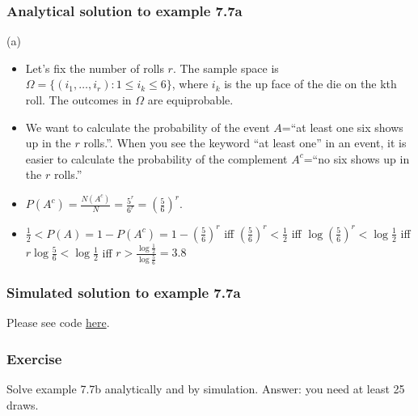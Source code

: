 \begin{frame}
    \frametitle{Analytical solution to example 7.7a}

	(a)
    \begin{itemize}[<+->]

		\item Let's fix the number of rolls $r$. The sample space is
$\Omega=\{(i_1,\ldots,i_r): 1\leq i_k\leq 6\}$, where $i_k$ is the up face of
the die on the kth roll. The outcomes in $\Omega$ are equiprobable.

        \item We want to calculate the probability of the event $A$=``at least
            one six shows up in the $r$ rolls.''. When you see the keyword ``at
            least one'' in an event, it is easier to calculate the probability
            of the complement $A^c$=``no six shows up in the $r$ rolls.''

        \item
            $P(A^c)=\frac{N(A^c)}{N}=\frac{5^r}{6^r}=\left(\frac{5}{6}\right)^r$.

        \item
            $\frac{1}{2}<P(A)=1-P(A^c)=1-\left(\frac{5}{6}\right)^r$
            iff
            $\left(\frac{5}{6}\right)^r<\frac{1}{2}$ iff
            $\log\left(\frac{5}{6}\right)^r<\log\frac{1}{2}$ iff
            $r\log\frac{5}{6}<\log\frac{1}{2}$ iff
            $r>\frac{\log\frac{1}{2}}{\log\frac{5}{6}}=3.8$
    \end{itemize}
\end{frame}

\begin{frame}[fragile]
    \frametitle{Simulated solution to example 7.7a}

    Please see code \href{https://joacorapela.github.io/gcnuBridging2023/auto_examples/foundations/plot_example7_7a.html#sphx-glr-auto-examples-foundations-plot-example7-7a-py}{here}.

\end{frame}

\begin{frame}
    \frametitle{Exercise}

    Solve example 7.7b analytically and by simulation. Answer: you need at least 25 draws.

\end{frame}

